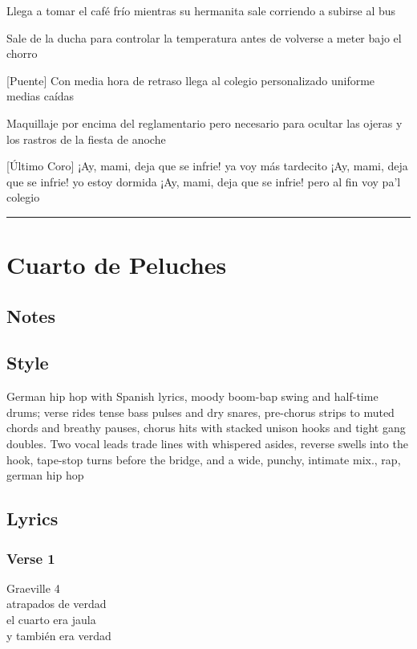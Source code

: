 Llega a tomar el café frío mientras su hermanita sale corriendo a
subirse al bus

Sale de la ducha para controlar la temperatura antes de volverse a meter
bajo el chorro

{[}Puente{]} Con media hora de retraso llega al colegio personalizado
uniforme medias caídas

Maquillaje por encima del reglamentario pero necesario para ocultar las
ojeras y los rastros de la fiesta de anoche

{[}Último Coro{]} ¡Ay, mami, deja que se infrie! ya voy más tardecito
¡Ay, mami, deja que se infrie! yo estoy dormida ¡Ay, mami, deja que se
infrie! pero al fin voy pa'l colegio

\begin{center}\rule{0.5\linewidth}{0.5pt}\end{center}

\section{Cuarto de Peluches}\label{cuarto-de-peluches}

\subsection{Notes}\label{notes-36}

\subsection{Style}\label{style-35}

German hip hop with Spanish lyrics, moody boom-bap swing and half-time
drums; verse rides tense bass pulses and dry snares, pre-chorus strips
to muted chords and breathy pauses, chorus hits with stacked unison
hooks and tight gang doubles. Two vocal leads trade lines with whispered
asides, reverse swells into the hook, tape-stop turns before the bridge,
and a wide, punchy, intimate mix., rap, german hip hop

\subsection{Lyrics}\label{lyrics-35}

\subsubsection{Verse 1}\label{verse-1-18}

Graeville 4\\
atrapados de verdad\\
el cuarto era jaula\\
y también era verdad

